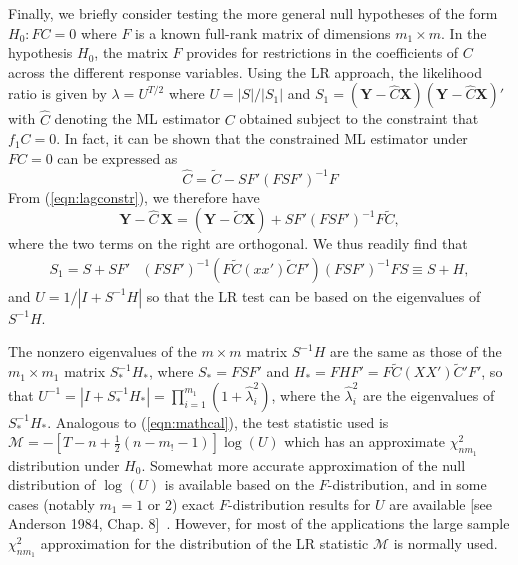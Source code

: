 Finally, we briefly consider testing the more general null hypotheses of the form $H_0: FC=0$ where $F$ is a known full-rank matrix of dimensions $m_1 \times m$. In the hypothesis $H_0$, the matrix $F$ provides for restrictions in the coefficients of $C$ across the different response variables. Using the LR approach, the likelihood ratio is given by $\lambda= U^{T/2}$ where $U= |S|/|S_1|$ and $S_1= (\mathbf{Y}-\hat{C}\mathbf{X})(\mathbf{Y}  - \hat{C}\mathbf{X})'$ with $\hat{C}$ denoting the ML estimator $C$ obtained subject to the constraint that $f_1C=0$. In fact, it can be shown that the constrained ML estimator under $FC= 0$ can be expressed as
	\begin{equation}\label{eqn:lagconstr}
	\hat{C}= \tilde{C} - SF'(FSF')^{-1}F
	\end{equation}
From (\ref{eqn:lagconstr}), we therefore have
	\begin{equation}\label{eqn:boldys}
	\mathbf{Y} - \hat{C}\,\mathbf{X}= (\mathbf{Y}-\tilde{C}\mathbf{X}) + SF'(FSF')^{-1}F\tilde{C},	
	\end{equation}
where the two terms on the right are orthogonal. We thus readily find that
	\begin{equation}\label{eqn:lastdouble5}
	\begin{split}
	S_1=S+SF'&(FSF')^{-1}(F\tilde{C} (xx') \tilde{C} F')(FSF')^{-1}FS \equiv S + H,
	\end{split}
	\end{equation}
and $U= 1/|I+S^{-1}H|$ so that the LR test can be based on the eigenvalues of $S^{-1}H$.


The nonzero eigenvalues of the $m\times m$ matrix $S^{-1}H$ are the same as those of the $m_1 \times m_1$ matrix $S_*^{-1}H_*$, where $S_*= FSF'$ and $H_*= FHF'= F\tilde{C}(XX') \tilde{C}' F'$, so that $U^{-1}= |I+S_*^{-1}H_*|= \prod_{i=1}^{m_1}(1+\hat{\lambda}_i^2)$, where the $\hat{\lambda}_i^2$ are the eigenvalues of $S_*^{-1}H_*$. Analogous to (\ref{eqn:mathcal}), the test statistic used is $\mathcal{M}=-[T-n+\frac{1}{2}(n-m_!-1)]\log(U)$ which has an approximate $\chi_{nm_1}^2$ distribution under $H_0$. Somewhat more accurate approximation of the null distribution of $\log(U)$ is available based on the $F$-distribution, and in some cases (notably $m_1= 1$ or 2) exact $F$-distribution results for $U$ are available [see Anderson 1984, Chap. 8]~\cite{andersontw2}. However, for most of the applications the large sample $\chi_{nm_1}^2$ approximation for the distribution of the LR statistic $\mathcal{M}$ is normally used. \\


